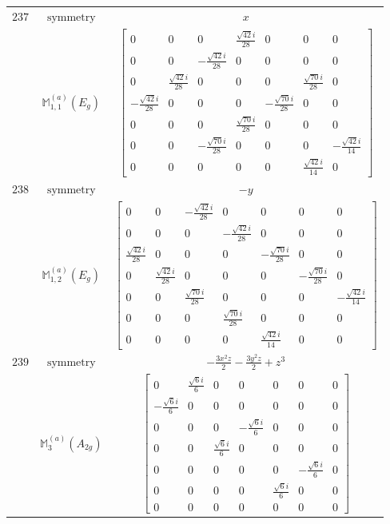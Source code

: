 \documentclass[fleqn,8pt,landscape]{jsarticle}
\begin{document}
\begin{longtable}{ccc}
$ 237 $ & $ \text{symmetry} $ & $ x $ \\
$  $ & $ \mathbb{M}_{1,1}^{(a)}(E_{g}) $ & $ \begin{bmatrix} 0 & 0 & 0 & \frac{\sqrt{42} i}{28} & 0 & 0 & 0 \\ 0 & 0 & - \frac{\sqrt{42} i}{28} & 0 & 0 & 0 & 0 \\ 0 & \frac{\sqrt{42} i}{28} & 0 & 0 & 0 & \frac{\sqrt{70} i}{28} & 0 \\ - \frac{\sqrt{42} i}{28} & 0 & 0 & 0 & - \frac{\sqrt{70} i}{28} & 0 & 0 \\ 0 & 0 & 0 & \frac{\sqrt{70} i}{28} & 0 & 0 & 0 \\ 0 & 0 & - \frac{\sqrt{70} i}{28} & 0 & 0 & 0 & - \frac{\sqrt{42} i}{14} \\ 0 & 0 & 0 & 0 & 0 & \frac{\sqrt{42} i}{14} & 0 \end{bmatrix} $ \\ \hline
$ 238 $ & $ \text{symmetry} $ & $ - y $ \\
$  $ & $ \mathbb{M}_{1,2}^{(a)}(E_{g}) $ & $ \begin{bmatrix} 0 & 0 & - \frac{\sqrt{42} i}{28} & 0 & 0 & 0 & 0 \\ 0 & 0 & 0 & - \frac{\sqrt{42} i}{28} & 0 & 0 & 0 \\ \frac{\sqrt{42} i}{28} & 0 & 0 & 0 & - \frac{\sqrt{70} i}{28} & 0 & 0 \\ 0 & \frac{\sqrt{42} i}{28} & 0 & 0 & 0 & - \frac{\sqrt{70} i}{28} & 0 \\ 0 & 0 & \frac{\sqrt{70} i}{28} & 0 & 0 & 0 & - \frac{\sqrt{42} i}{14} \\ 0 & 0 & 0 & \frac{\sqrt{70} i}{28} & 0 & 0 & 0 \\ 0 & 0 & 0 & 0 & \frac{\sqrt{42} i}{14} & 0 & 0 \end{bmatrix} $ \\ \hline
$ 239 $ & $ \text{symmetry} $ & $ - \frac{3 x^{2} z}{2} - \frac{3 y^{2} z}{2} + z^{3} $ \\
$  $ & $ \mathbb{M}_{3}^{(a)}(A_{2g}) $ & $ \begin{bmatrix} 0 & \frac{\sqrt{6} i}{6} & 0 & 0 & 0 & 0 & 0 \\ - \frac{\sqrt{6} i}{6} & 0 & 0 & 0 & 0 & 0 & 0 \\ 0 & 0 & 0 & - \frac{\sqrt{6} i}{6} & 0 & 0 & 0 \\ 0 & 0 & \frac{\sqrt{6} i}{6} & 0 & 0 & 0 & 0 \\ 0 & 0 & 0 & 0 & 0 & - \frac{\sqrt{6} i}{6} & 0 \\ 0 & 0 & 0 & 0 & \frac{\sqrt{6} i}{6} & 0 & 0 \\ 0 & 0 & 0 & 0 & 0 & 0 & 0 \end{bmatrix} $ \\ \hline

\end{longtable}
\end{document}
